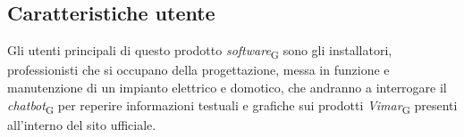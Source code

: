 \subsection{Caratteristiche utente}
Gli utenti principali di questo prodotto \textit{software}\textsubscript{G} sono gli installatori, professionisti che si occupano della progettazione, messa in funzione e manutenzione di un impianto elettrico e domotico, che andranno a interrogare il \textit{chatbot}\textsubscript{G} per reperire informazioni testuali e grafiche sui prodotti \textit{Vimar}\textsubscript{G} presenti all'interno del sito ufficiale. 